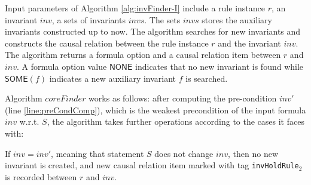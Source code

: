 \documentclass[conference]{IEEEtran}
\begin{document}
{\begin{algorithm}

\end{algorithm}
\vspace{-5pt}



Input parameters of Algorithm \ref{alg:invFinder-I} include a rule instance $r$, an invariant $inv$, a sets of invariants $invs$.  The sets $invs$   stores the auxiliary invariants constructed up to now. The algorithm   searches for new invariants and    constructs the causal relation between the rule instance $r$ and the invariant $inv$.
The algorithm returns a formula option and a causal relation item between $r$ and $inv$. A formula option value $\mathsf{NONE}$ indicates that no new invariant is found while $\mathsf{SOME}(f)$ indicates a new auxiliary invariant $f$ is searched.


%

Algorithm $coreFinder$ works as follows: after computing the pre-condition $ inv'$ (line \ref{line:preCondComp}), which is the weakest precondition of the input formula $inv$ w.r.t. $S$, the algorithm takes further operations according to the cases it faces with:

\begin{description}[leftmargin=0pt,noitemsep,nolistsep]
\item[(1)] If $ inv=inv'$, meaning that statement $S$ does not change $inv$, then no new invariant is created, and  new causal
relation item marked with tag {\tt invHoldRule$_2$} is recorded
between $r$ and $inv$.%


\end{description}}
\end{document}
